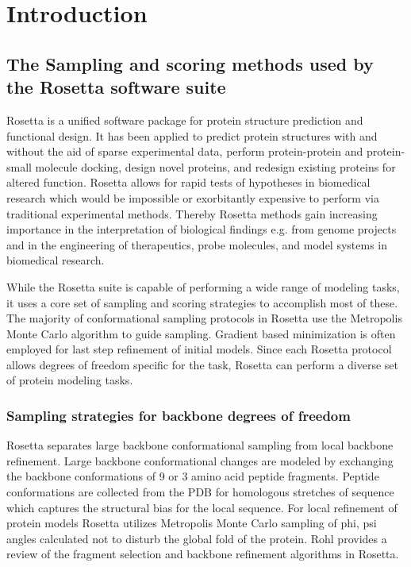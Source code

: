 \chapter{Introduction}
\section{The Sampling and scoring methods used by the Rosetta software suite}
Rosetta is a unified software package for protein structure prediction and functional design.
It has been applied to predict protein structures with and without the aid of sparse experimental data, perform protein-protein and protein-small molecule docking, design novel proteins, and redesign existing proteins for altered function.
Rosetta allows for rapid tests of hypotheses in biomedical research which would be impossible or exorbitantly expensive to perform via traditional experimental methods.
Thereby Rosetta methods gain increasing importance in the interpretation of biological findings e.g. from genome projects and in the engineering of therapeutics, probe molecules, and model systems in biomedical research. 

While the Rosetta suite is capable of performing a wide range of modeling tasks, it uses a core set of sampling and scoring strategies to accomplish most of these. 
The majority of conformational sampling protocols in Rosetta use the Metropolis Monte Carlo algorithm to guide sampling.
Gradient based minimization is often employed for last step refinement of initial models.
Since each Rosetta protocol allows degrees of freedom specific for the task, Rosetta can perform a diverse set of protein modeling tasks\citep{Wang:2007du}.

\subsection{Sampling strategies for backbone degrees of freedom}
Rosetta separates large backbone conformational sampling from local backbone refinement.
Large backbone conformational changes are modeled by exchanging the backbone conformations of 9 or 3 amino acid peptide fragments.
Peptide conformations are collected from the PDB for homologous stretches of sequence\citep{Simons:1997do} which captures the structural bias for the local sequence\citep{Bystroff:1996vl}.
For local refinement of protein models Rosetta utilizes Metropolis Monte Carlo sampling of phi, psi angles calculated not to disturb the global fold of the protein.
Rohl\citep{Rohl:2004dh} provides a review of the fragment selection and backbone refinement algorithms in Rosetta. 

